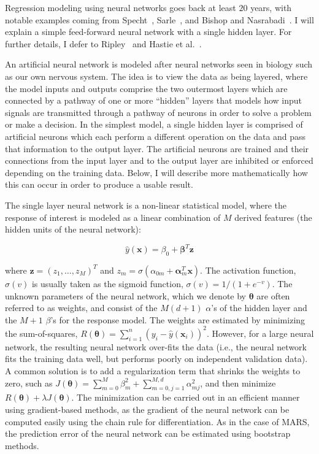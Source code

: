 Regression modeling using neural networks goes back at least $20$ years, with notable examples coming from Specht~\cite{Specht1991}, Sarle~\cite{Sarle1994}, and Bishop and Nasrabadi~\cite{BishopNasrabadi2006}.
%
I will explain a simple feed-forward neural network with a single hidden layer.
%
For further details, I defer to Ripley~\cite{Ripley1996} and Hastie et al.~\cite{HastieTibshiraniFriedman2008}.

An artificial neural network is modeled after neural networks seen in biology such as our own nervous system.
%
The idea is to view the data as being layered, where the model inputs and outputs comprise the two outermost layers which are connected by a pathway of one or more ``hidden'' layers that models how input signals are transmitted through a pathway of neurons in order to solve a problem or make a decision.
%
In the simplest model, a single hidden layer is comprised of artificial neurons which each perform a different operation on the data and pass that information to the output layer.
%
The artificial neurons are trained and their connections from the input layer and to the output layer are inhibited or enforced depending on the training data.
%
Below, I will describe more mathematically how this can occur in order to produce a usable result.

The single layer neural network is a non-linear statistical model, where the response of interest is modeled as a linear combination of $M$ derived features (the hidden units of the neural network):

\begin{equation}
\hat{y}(\mathbf{x}) = \beta_0 + \boldsymbol{\beta}^T \mathbf{z}
\end{equation}

where $\mathbf{z} = (z_1, \dots, z_M)^T$ and $z_m = \sigma(\alpha_{0m} + \boldsymbol{\alpha}_m^T \mathbf{x})$.
%
The activation function, $\sigma(v)$ is usually taken as the sigmoid function, $\sigma(v) = 1/(1+e^{-v})$.
%
The unknown parameters of the neural network, which we denote by $\boldsymbol{\theta}$ are often referred to as weights, and consist of the $M(d+1)$ $\alpha$'s of the hidden layer and the $M+1$ $\beta$'s for the response model.
%
The weights are estimated by minimizing the sum-of-squares, $R(\boldsymbol{\theta}) = \sum_{i=1}^n (y_i - \hat{y}(\mathbf{x}_i))^2$.
%
However, for a large neural network, the resulting neural network over-fits the data (i.e., the neural network fits the training data well, but performs poorly on independent validation data).
%
A common solution is to add a regularization term that shrinks the weights to zero, such as $J(\boldsymbol{\theta}) = \sum_{m=0}^M \beta_{m}^2 + \sum_{m=0,j=1}^{M,d} \alpha_{mj}^2$, and then minimize $R(\boldsymbol{\theta}) + \lambda J(\boldsymbol{\theta})$.
%
The minimization can be carried out in an efficient manner using gradient-based methods, as the gradient of the neural network can be computed easily using the chain rule for differentiation.
%
As in the case of MARS, the prediction error of the neural network can be estimated using bootstrap methods.

